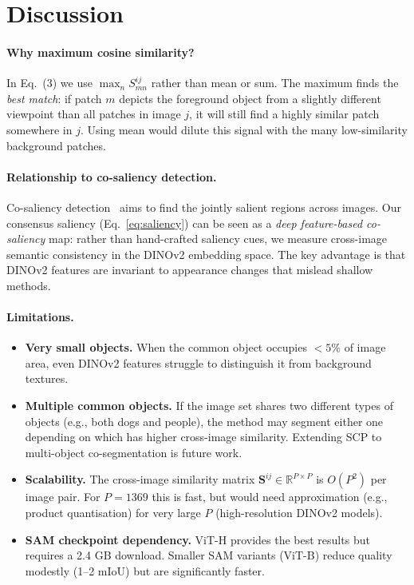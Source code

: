 \documentclass[10pt,twocolumn,letterpaper]{article}
\begin{document}
\section{Discussion}
\label{sec:discussion}

\paragraph{Why maximum cosine similarity?}
In Eq.~(3) we use $\max_n S^{ij}_{mn}$ rather than mean or sum.
The maximum finds the \emph{best match}: if patch $m$ depicts the foreground
object from a slightly different viewpoint than all patches in image $j$, it will
still find a highly similar patch somewhere in $j$.
Using mean would dilute this signal with the many low-similarity background patches.

\paragraph{Relationship to co-saliency detection.}
Co-saliency detection~\cite{zhang2015cosaliency} aims to find the jointly
salient regions across images.
Our consensus saliency (Eq.~\ref{eq:saliency}) can be seen as a
\emph{deep feature-based co-saliency} map: rather than hand-crafted saliency
cues, we measure cross-image semantic consistency in the DINOv2 embedding space.
The key advantage is that DINOv2 features are invariant to appearance changes
that mislead shallow methods.

\paragraph{Limitations.}
\begin{itemize}
  \item \textbf{Very small objects.} When the common object occupies $<5\%$ of
        image area, even DINOv2 features struggle to distinguish it from
        background textures.
  \item \textbf{Multiple common objects.} If the image set shares two different
        types of objects (e.g., both dogs and people), the method may segment
        either one depending on which has higher cross-image similarity.
        Extending SCP to multi-object co-segmentation is future work.
  \item \textbf{Scalability.} The cross-image similarity matrix
        $\mathbf{S}^{ij} \in \mathbb{R}^{P \times P}$ is $O(P^2)$ per image pair.
        For $P = 1369$ this is fast, but would need approximation (e.g.,
        product quantisation) for very large $P$ (high-resolution DINOv2 models).
  \item \textbf{SAM checkpoint dependency.} ViT-H provides the best results
        but requires a 2.4 GB download. Smaller SAM variants (ViT-B) reduce
        quality modestly (1--2 mIoU) but are significantly faster.
\end{itemize}
\end{document}
